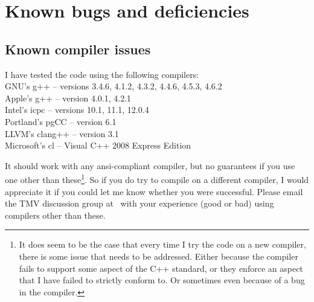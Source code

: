 
\section{Known bugs and deficiencies}
\label{Bugs}

\subsection{Known compiler issues}
\label{Install_Issues}

I have tested the code using the following compilers:\\
$\quad$\\
% 
GNU's g++ -- versions 3.4.6, 4.1.2, 4.3.2, 4.4.6, 4.5.3, 4.6.2 \\
Apple's g++ -- version 4.0.1, 4.2.1 \\
Intel's icpc -- versions 10.1, 11.1, 12.0.4\\
Portland's pgCC -- version 6.1\\
LLVM's clang++ -- version 3.1\\
Microsoft's cl -- Visual C++ 2008 Express Edition\\

It should work with any ansi-compliant
compiler, but no guarantees if you use one other than these\footnote{
It does seem to be the case that 
every time I try the code on a new compiler, there is some issue that needs to be addressed.  
Either because the compiler fails to support some aspect of the C++ standard, or they enforce
an aspect that I have failed to strictly conform to.  Or sometimes even because of a bug in the compiler.}.
  So if you do try to compile on a different compiler, 
I would appreciate it if you could let me know whether you were successful.  
Please email the TMV discussion group at \mygroup\ with your experience (good or bad) using 
compilers other than these.

